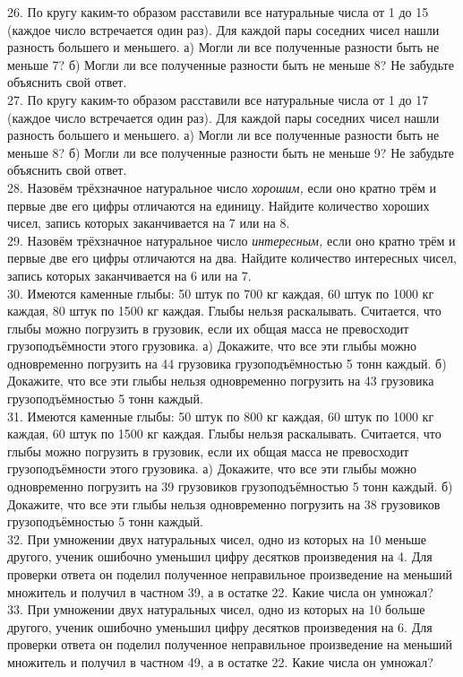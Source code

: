 26. По кругу каким-то образом расставили все натуральные числа от 1 до 15 (каждое число встречается один раз). Для каждой пары соседних чисел нашли разность большего и меньшего. а) Могли ли все полученные разности быть не меньше 7? б) Могли ли все полученные разности быть не меньше 8? Не забудьте объяснить свой ответ.\\
27. По кругу каким-то образом расставили все натуральные числа от 1 до 17 (каждое число встречается один раз). Для каждой пары соседних чисел нашли разность большего и меньшего. а) Могли ли все полученные разности быть не меньше 8? б) Могли ли все полученные разности быть не меньше 9? Не забудьте объяснить свой ответ.\\
28. Назовём трёхзначное натуральное число {\it хорошим,} если оно кратно трём и первые две его цифры отличаются на единицу. Найдите количество хороших чисел, запись которых заканчивается на 7 или на 8.\\
29. Назовём трёхзначное натуральное число {\it интересным,} если оно кратно трём и первые две его цифры отличаются на два. Найдите количество интересных чисел, запись которых заканчивается на 6 или на 7.\\
30. Имеются каменные глыбы: 50 штук по 700 кг каждая, 60 штук по 1000 кг каждая, 80 штук по 1500 кг каждая. Глыбы нельзя раскалывать. Считается, что глыбы можно погрузить в грузовик, если их общая масса не превосходит грузоподъёмности этого грузовика. а) Докажите, что все эти глыбы можно одновременно погрузить на 44 грузовика грузоподъёмностью 5 тонн каждый. б) Докажите, что все эти глыбы нельзя одновременно погрузить на 43 грузовика грузоподъёмностью 5 тонн каждый.\\
31. Имеются каменные глыбы: 50 штук по 800 кг каждая, 60 штук по 1000 кг каждая, 60 штук по 1500 кг каждая. Глыбы нельзя раскалывать. Считается, что глыбы можно погрузить в грузовик, если их общая масса не превосходит грузоподъёмности этого грузовика. а) Докажите, что все эти глыбы можно одновременно погрузить на 39 грузовиков грузоподъёмностью 5 тонн каждый. б) Докажите, что все эти глыбы нельзя одновременно погрузить на 38 грузовиков грузоподъёмностью 5 тонн каждый.\\
32. При умножении двух натуральных чисел, одно из которых на 10 меньше другого, ученик ошибочно уменьшил цифру десятков произведения на 4. Для проверки ответа он поделил полученное неправильное произведение на меньший множитель и получил в частном 39, а в остатке 22. Какие числа он умножал?\\
33. При умножении двух натуральных чисел, одно из которых на 10 больше другого, ученик ошибочно уменьшил цифру десятков произведения на 6. Для проверки ответа он поделил полученное неправильное произведение на меньший множитель и получил в частном 49, а в остатке 22. Какие числа он умножал?\\
